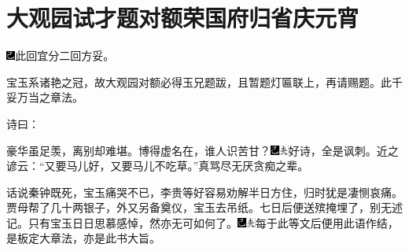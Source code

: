 
\chapter{大观园试才题对额\hspace{.5em}荣国府归省庆元宵}

{\includegraphics[width=3mm]{../Images/00003}\kaishu 此回宜分二回方妥。}

{\kaishu 宝玉系诸艳之冠，故大观园对额必得玉兄题跋，且暂题灯匾联上，再请赐题。此千妥万当之章法。}

诗曰：

豪华虽足羡，离别却难堪。博得虚名在，谁人识苦甘？{\includegraphics[width=3mm]{../Images/00003}\includegraphics[width=3mm]{../Images/00012}\footnotesize \kaishu 好诗，全是讽刺。近之谚云：``又要马儿好，又要马儿不吃草。''真骂尽无厌贪痴之辈。}

话说秦钟既死，宝玉痛哭不已，李贵等好容易劝解半日方住，归时犹是凄恻哀痛。贾母帮了几十两银子，外又另备奠仪，宝玉去吊纸。七日后便送殡掩埋了，别无述记。只有宝玉日日思慕感悼，然亦无可如何了。{\includegraphics[width=3mm]{../Images/00003}\includegraphics[width=3mm]{../Images/00012}\footnotesize \kaishu 每于此等文后便用此语作结，是板定大章法，亦是此书大旨。}

